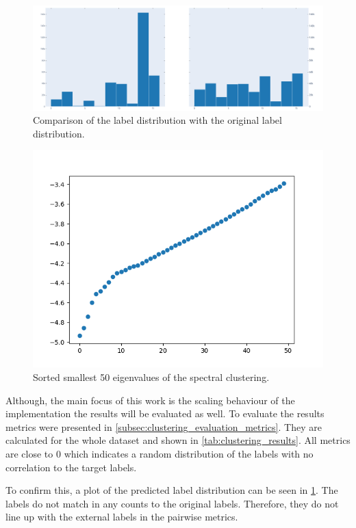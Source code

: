   \begin{figure}
    \centering
    \includegraphics[width=0.9\linewidth]{images/label_distribution.png}
    \caption{Comparison of the label distribution with the original label distribution.}
    \label{fig:label_distribution}
  \end{figure}

  \begin{figure}
    \centering
    \includegraphics[width=0.9\linewidth]{images/eigenvalues.png}
    \caption{Sorted smallest 50 eigenvalues of the spectral clustering.}
    \label{fig:eigenvalues}
  \end{figure}



Although, the main focus of this work is the scaling behaviour of the implementation the results will be evaluated as
well. To evaluate the results metrics were presented in \cref{subsec:clustering_evaluation_metrics}.
They are calculated for the whole dataset and shown in \cref{tab:clustering_results}.
All metrics are close to \(0\) which indicates a random distribution of the labels with no correlation to the target
labels.

To confirm this, a plot of the predicted label distribution can be seen in \cref{fig:label_distribution}.
The labels do not match in any counts to the original labels. Therefore, they do not line up with the external labels
in the pairwise metrics.

